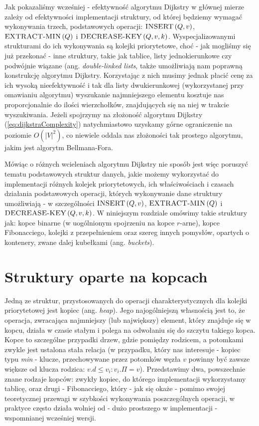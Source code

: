 Jak pokazaliśmy wcześniej - efektywność algorytmu Dijkstry w głównej mierze zależy od efektywności implementacji struktury, od której będziemy wymagać wykonywania trzech, podstawowych operacji: $\textrm{\textsc{INSERT}} \left( Q, v \right)$, $\textrm{\textsc{EXTRACT-MIN}} \left( Q \right)$ i $\textrm{\textsc{DECREASE-KEY}} \left( Q, v, k \right)$. Wyspecjalizowanymi strukturami do ich wykonywania są kolejki priorytetowe, choć - jak mogliśmy się już przekonać - inne struktury, takie jak tablice, listy jednokierunkowe czy podwójnie wiązane (ang. \textit{double-linked lists}, także umożliwiają nam poprawną konstrukcję algorytmu Dijkstry. Korzystając z nich musimy jednak płacić cenę za ich wysoką nieefektywność i tak dla listy dwukierunkowej (wykorzystanej przy omawianiu algorytmu) wyszukanie najmniejszego elementu kosztuje nas proporcjonalnie do ilości wierzchołków, znajdujących się na niej w trakcie wyszukiwania. Jeżeli spojrzymy na złożoność algorytmu Dijkstry (\ref{eq:dijkstraComplexity}) natychmiastowo uzyskamy górne ograniczenie na poziomie $ O \left( \left| V \right| ^{2} \right)$, co niewiele oddala nas złożoności tak prostego algorytmu, jakim jest algorytm Bellmana-Fora.


Mówiąc o różnych wcieleniach algorytmu Dijkstry nie sposób jest więc poruszyć tematu podstawowych struktur danych, jakie możemy wykorzystać do implementacji różnych kolejek priorytetowych, ich właściwościach i czasach działania podstawowych operacji, których wykonywanie dane struktury umożliwiają - w szczególności $\textrm{\textsc{INSERT}} \left( Q, v \right)$, $\textrm{\textsc{EXTRACT-MIN}} \left( Q \right)$ i $\textrm{\textsc{DECREASE-KEY}} \left( Q, v, k \right)$. W niniejszym rozdziale omówimy takie struktury jak: kopce binarne (w uogólnionym spojrzeniu na kopce $r$-arne), kopce Fibonacciego, kolejki z przepełnieniem oraz szereg innych pomysłów, opartych o kontenery, zwane dalej kubełkami (ang. \textit{buckets}).

\section{Struktury oparte na kopcach}

Jedną ze struktur, przystosowanych do operacji charakterystycznych dla kolejki priorytetowej jest kopiec (ang. \textit{heap}). Jego najogólniejszą własnością jest to, że operacja, zwracająca najmniejszy (lub największy) element, który znajduje się w kopcu, działa w czasie stałym i polega na odwołaniu się do szczytu takiego kopca. Kopce to szczególne przypadki drzew, gdzie pomiędzy rodzicem, a potomkami zwykle jest ustalona stała relacja (w przypadku, który nas interesuje - kopiec typu \textit{min} - klucze, przechowywane przez potomków węzła $v$ powinny być zawsze większe od klucza rodzica: $v.d \leqslant v_{i} : v_{i}.\Pi = v$). Przedstawimy dwa, powszechnie znane rodzaje kopców: zwykły kopiec, do którego implementacji wykorzystamy tablicę, oraz drugi - Fibonacciego, który - jak się okaże - pomimo swojej teoretycznej przewagi w szybkości wykonywania poszczególnych operacji, w praktyce często działa wolniej od - dużo prostszego w implementacji - wspomnianej wcześniej wersji.

